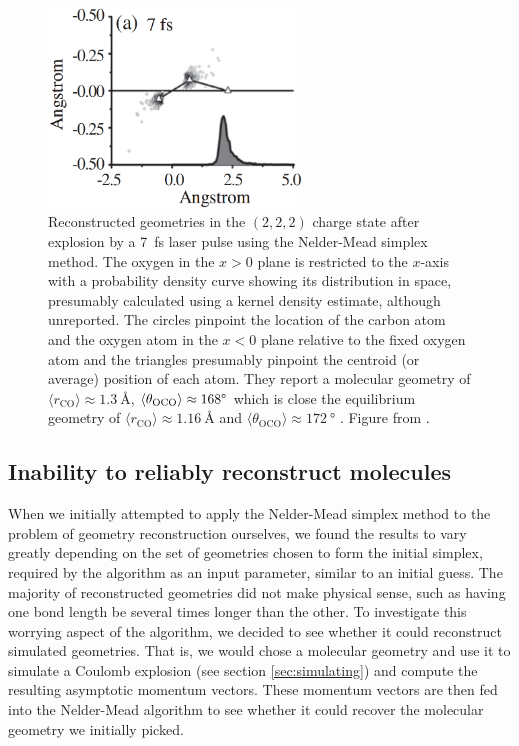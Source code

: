 \begin{figure}
  \centering
  \includegraphics[width=0.6\textwidth]{gfx/SimplexPRL}
  \caption[Reconstructed  in the $(2,2,2)$ charge state using the Nelder-Mead simplex method.]
  {Reconstructed  geometries in the $(2,2,2)$ charge state after explosion by a \SI{7}{\fs} laser pulse using the Nelder-Mead simplex method. The oxygen in the $x>0$ plane is restricted to the $x$-axis with a probability density curve showing its distribution in space, presumably calculated using a kernel density estimate, although unreported. The circles pinpoint the location of the carbon atom and the oxygen atom in the $x<0$ plane relative to the fixed oxygen atom and the triangles presumably pinpoint the centroid (or average) position of each atom. They report a molecular geometry of $\langle r_\mathrm{CO} \rangle \approx \SI{1.3}{\angstrom}$, $\langle \theta_\mathrm{OCO} \rangle \approx 168\degree$ which is close the equilibrium geometry of $\langle r_\mathrm{CO} \rangle \approx \SI{1.16}{\angstrom}$ \citep{ChemistryOfTheElements} and $\langle \theta_\mathrm{OCO} \rangle \approx \SI{172}{\degree}$ \citep{Siegmann02, Mathur92}. Figure from \citet{Bocharova11}.}
  \label{fig:simplexPRL}
\end{figure}

\subsection{Inability to reliably reconstruct molecules} \label{ssec:simplexFail}

When we initially attempted to apply the Nelder-Mead simplex method to the problem of geometry reconstruction ourselves, we found the results to vary greatly depending on the set of geometries chosen to form the initial simplex, required by the algorithm as an input parameter, similar to an initial guess. The majority of reconstructed geometries did not make physical sense, such as having one bond length be several times longer than the other. To investigate this worrying aspect of the algorithm, we decided to see whether it could reconstruct simulated geometries. That is, we would chose a molecular geometry and use it to simulate a Coulomb explosion (see section \ref{sec:simulating}) and compute the resulting asymptotic momentum vectors. These momentum vectors are then fed into the Nelder-Mead algorithm to see whether it could recover the molecular geometry we initially picked.

